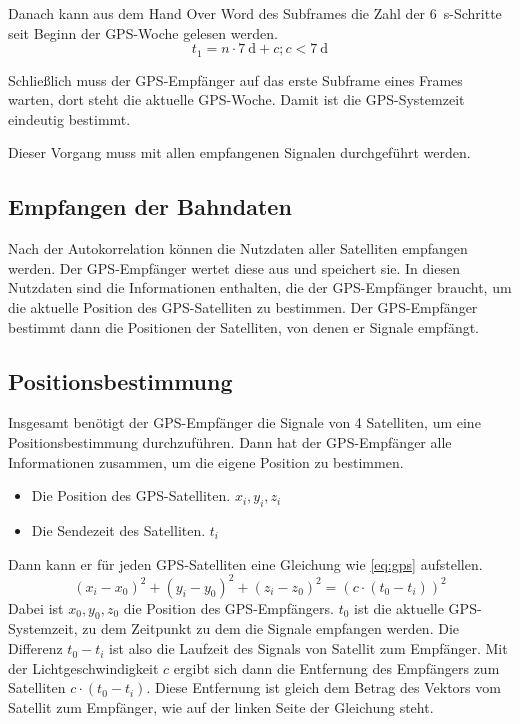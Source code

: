 \documentclass[12pt,a4paper]{scrartcl}
\begin{document}
Danach kann aus dem Hand Over Word des Subframes die Zahl der \SI{6}{\second}-Schritte seit Beginn der GPS-Woche gelesen werden. $$t_1 = n\cdot\SI{7}{\day} + c; c<\SI{7}{\day}$$

Schließlich muss der GPS-Empfänger auf das erste Subframe eines Frames warten, dort steht die aktuelle GPS-Woche. Damit ist die GPS-Systemzeit eindeutig bestimmt.

Dieser Vorgang muss mit allen empfangenen Signalen durchgeführt werden.

\subsection{Empfangen der Bahndaten}
Nach der Autokorrelation können die Nutzdaten aller Satelliten empfangen werden. Der GPS-Empfänger wertet diese aus und speichert sie. In diesen Nutzdaten sind die Informationen enthalten, die der GPS-Empfänger braucht, um die aktuelle Position des GPS-Satelliten zu bestimmen. Der GPS-Empfänger bestimmt dann die Positionen der Satelliten, von denen er Signale empfängt.

\subsection{Positionsbestimmung}
\label{sec:positioning}
Insgesamt benötigt der GPS-Empfänger die Signale von 4 Satelliten, um eine Positionsbestimmung durchzuführen.
Dann hat der GPS-Empfänger alle Informationen zusammen, um die eigene Position zu bestimmen.

\begin{itemize}
\item Die Position des GPS-Satelliten. $x_i,y_i,z_i$
\item Die Sendezeit des Satelliten. $t_i$
\end{itemize}

Dann kann er für jeden GPS-Satelliten eine Gleichung wie \eqref{eq:gps} aufstellen.
\begin{equation}
\label{eq:gps}
(x_i - x_0)^2 + (y_i - y_0)^2 + (z_i - z_0)^2 = (c\cdot(t_0-t_i))^2
\end{equation}
Dabei ist $x_0,y_0,z_0$ die Position des GPS-Empfängers. $t_0$ ist die aktuelle GPS-Systemzeit, zu dem Zeitpunkt zu dem die Signale empfangen werden. Die Differenz $t_0-t_i$ ist also die Laufzeit des Signals von Satellit zum Empfänger. Mit der Lichtgeschwindigkeit $c$ ergibt sich dann die Entfernung des Empfängers zum Satelliten $c\cdot (t_0-t_i)$. Diese Entfernung ist gleich dem Betrag des Vektors vom Satellit zum Empfänger, wie auf der linken Seite der Gleichung steht.
\end{document}

